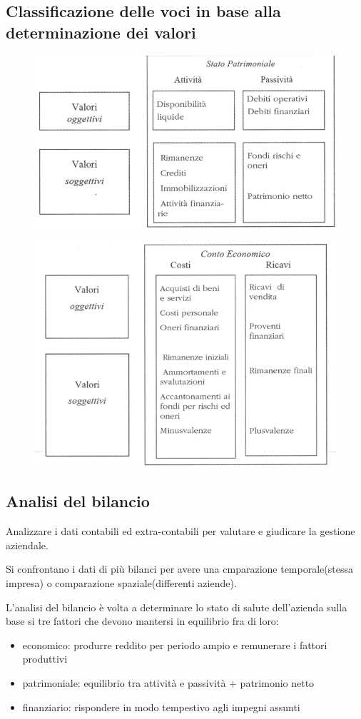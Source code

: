 \subsection{Classificazione delle voci in base alla determinazione dei valori}
\begin{figure}[H]
    \centering
    \includegraphics[width=0.4\linewidth]{2/img/Screenshot from 2022-07-09 18-21-32.png}
\end{figure}
\begin{figure}[H]
    \centering
    \includegraphics[width=0.4\linewidth]{2/img/Screenshot from 2022-07-09 18-22-41.png}
\end{figure}

\subsection{Analisi del bilancio}
Analizzare i dati contabili ed extra-contabili per valutare e giudicare la gestione aziendale.

Si confrontano i dati di più bilanci per avere una cmparazione temporale(stessa impresa) o comparazione spaziale(differenti aziende).

L'analisi del bilancio è volta a determinare lo stato di salute dell'azienda sulla base
si tre fattori che devono mantersi in equilibrio fra di loro:
\begin{itemize}
    \item economico: produrre reddito per periodo ampio e remunerare i fattori produttivi
    \item patrimoniale: equilibrio tra attività e passività + patrimonio netto
    \item finanziario: rispondere in modo tempestivo agli impegni assunti
\end{itemize}

